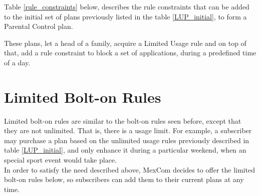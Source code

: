 Table \ref{rule_constraints} below, describes the rule constraints that can be added to the initial set of plans previously listed in the table \ref{LUP_initial}, to form a Parental Control plan. \\

\begin{table}[H]
\begin{center}
\end{center}
\caption{Rule Constraints}
\label{rule_constraints}
\end{table}

These plans, let a head of a family, acquire a Limited Usage rule and on top of that, add a rule constraint to block a set of applications, during a predefined time of a day. 

\section{Limited Bolt-on Rules}
\noindent
Limited bolt-on rules are similar to the bolt-on rules seen before, except that they are not unlimited. That is, there is a usage limit. For example, a subscriber may purchase a plan based on the unlimited usage rules previously described in table \ref{LUP_initial}, and only enhance it during a particular weekend, when an special sport event would take place. \\

In order to satisfy the need described above, MexCom decides to offer the limited bolt-on rules below, so subscribers can add them to their current plans at any time. \\

